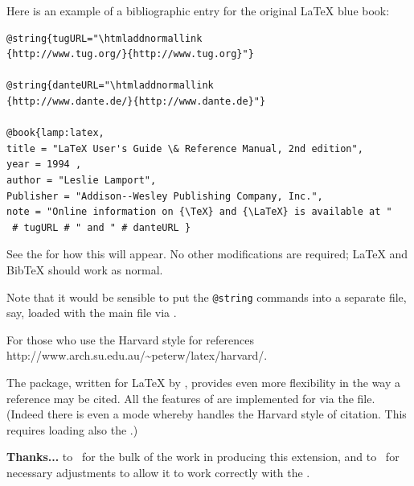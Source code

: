 \bigskip
{}%
%
\html{\\}%
\noindent
Here is an example of a bibliographic entry for the original
\LaTeX{} \cite{lamp:latex} blue book:\nobreak
\begin{small}
\begin{verbatim}
@string{tugURL="\htmladdnormallink
{http://www.tug.org/}{http://www.tug.org}"}

@string{danteURL="\htmladdnormallink
{http://www.dante.de/}{http://www.dante.de}"}

@book{lamp:latex,
title = "LaTeX User's Guide \& Reference Manual, 2nd edition",
year = 1994 ,
author = "Leslie Lamport",
Publisher = "Addison--Wesley Publishing Company, Inc.",
note = "Online information on {\TeX} and {\LaTeX} is available at "
 # tugURL # " and " # danteURL }
\end{verbatim}
\end{small}
See the  for how this will appear.\html{\\}
No other modifications are required; \LaTeX{} and Bib\TeX{} should work as normal.
%
%
\begin{changebar}
Note that it would be sensible to put the \texttt{@string} commands
into a separate file,  say, 
loaded with the main file via\html{\\} \verb||.%
\end{changebar}

\smallskip{}%
\label{harvard}\html{\\}%
\noindent
For those who use the Harvard style for references
%
{http://www.arch.su.edu.au/\~{}peterw/latex/harvard/}.

%
%
%
\begin{changebar}
The  package, written for \LaTeX{} by \PatrickDaly,
provides even more flexibility in the way a reference may be cited. 
All the features of  are implemented 
for \latextohtml{} via the  file.
(Indeed there is even a mode whereby  handles
the Harvard style of citation. 
This requires loading also the  .)

\medskip
\noindent\textbf{Thanks...} to \Wilck\ for the bulk of the work 
in producing this extension, and to \RossMoore\ for 
necessary adjustments to allow it to work correctly with the 
.
\end{changebar}


